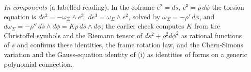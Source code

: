 \emph{In components} (a labelled reading). In the coframe $e^{2} = ds$, $e^{3} = \rho\,d\phi$ the torsion equation is $de^{2} = -\omega_{\Sigma}\wedge e^{3}$, $de^{3} = \omega_{\Sigma}\wedge e^{2}$, solved by $\omega_{\Sigma} = -\rho'\,d\phi$, and $d\omega_{\Sigma} = -\rho''\,ds\wedge d\phi = K\rho\,ds\wedge d\phi$; the earlier check computes $K$ from the Christoffel symbols and the Riemann tensor of $ds^{2} + \rho^{2}d\phi^{2}$ as rational functions of $s$ and confirms these identities, the frame rotation law, and the Chern-Simons variation and the Gauss-equation identity of (i) as identities of forms on a generic polynomial connection.
